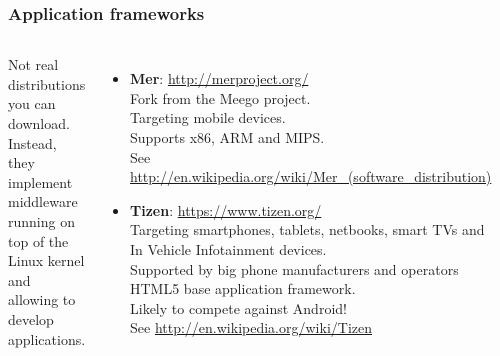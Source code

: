 \begin{frame}
  \frametitle{Application frameworks}
  \small
  \begin{columns}
    Not real distributions you can download. Instead, they
    implement middleware running on top of the Linux kernel
    and allowing to develop applications.
    \begin{itemize}
    \item {\bf Mer}: \url{http://merproject.org/}\\
      Fork from the Meego project.\\
      Targeting mobile devices.\\
      Supports x86, ARM and MIPS. \\
      See \url{http://en.wikipedia.org/wiki/Mer\_(software\_distribution)}
    \item {\bf Tizen}: \url{https://www.tizen.org/} \\
      Targeting smartphones, tablets, netbooks, smart TVs and
      In Vehicle Infotainment devices.\\
      Supported by big phone manufacturers and operators \\
      HTML5 base application framework. \\
      Likely to compete against Android! \\
      See \url{http://en.wikipedia.org/wiki/Tizen}
    \end{itemize}
    \includegraphics[width=\textwidth]{slides/sysdev-embedded-linux/mer.png}\\

\end{columns}
\end{frame}
